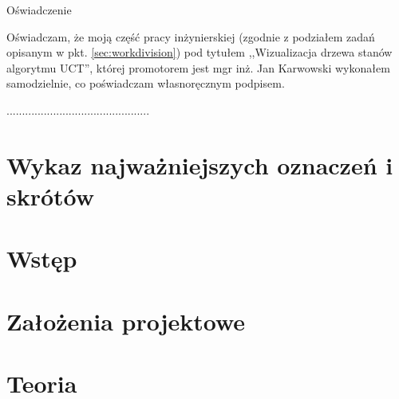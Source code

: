 \documentclass[a4paper,11pt,twoside]{report}
\theoremstyle{definition}
\newcommand{\tytul}{Wizualizacja drzewa stanów algorytmu UCT}
\newcommand{\supervisor}{mgr inż. Jan Karwowski }
\begin{document}
\begin{center}
Oświadczenie
\end{center}

\indent Oświadczam, że moją część pracy inżynierskiej (zgodnie z podziałem zadań opisanym w pkt. \ref{sec:workdivision}) pod tytułem ,,\tytul '', której promotorem jest \supervisor wykonałem samodzielnie, co poświadczam własnoręcznym podpisem.
\vspace{2cm}

\begin{flushright}
  \begin{minipage}{50mm}
    \begin{center}
      ..............................................

    \end{center}
  \end{minipage}
\end{flushright}

\thispagestyle{empty}
\newpage

\null\thispagestyle{empty}\newpage


\tableofcontents
\thispagestyle{empty}

\newpage %

\null\thispagestyle{empty}\newpage
\pagestyle{fancy}
\setcounter{page}{11} %

\chapter*{Wykaz najważniejszych oznaczeń i skrótów}


\chapter{Wstęp}


\chapter{Założenia projektowe} \label{chap:zal_pr}


\chapter{Teoria} \label{chap:teoria}

\end{document}
